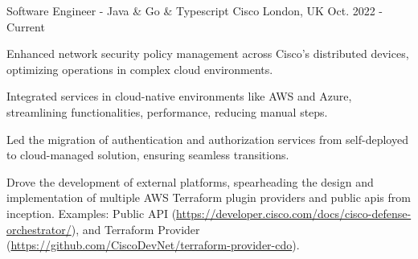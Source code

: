 

\begin{cventries}


\cventry
    {Software Engineer - Java \& Go \& Typescript} %
    {Cisco} %
    {London, UK} %
    {Oct. 2022 - Current} %
    {
      \begin{cvitems}
        \item {Enhanced network security policy management across Cisco's distributed devices, optimizing operations in complex cloud environments.}
        \item {Integrated services in cloud-native environments like AWS and Azure, streamlining functionalities, performance, reducing manual steps.}
        \item {Led the migration of authentication and authorization services from self-deployed to cloud-managed solution, ensuring seamless transitions.}
        \item {Drove the development of external platforms, spearheading the design and implementation of multiple AWS Terraform plugin providers and public apis from inception. Examples: Public API (\href{https://developer.cisco.com/docs/cisco-defense-orchestrator/}{https://developer.cisco.com/docs/cisco-defense-orchestrator/}), and Terraform Provider (\href{https://github.com/CiscoDevNet/terraform-provider-cdo}{https://github.com/CiscoDevNet/terraform-provider-cdo}).}
    \end{cvitems}
    }


\end{cventries}

